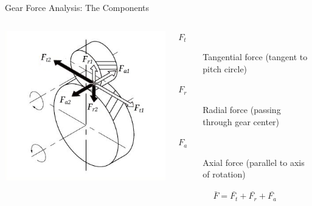 \documentclass[10pt, svgnames]{beamer}
\begin{document}
\begin{frame}[label={sec:org9053924}]{Gear Force Analysis: The Components}
\begin{columns}
\begin{column}{0.6\columnwidth}
\begin{center}
\includegraphics[width=.9\linewidth]{pictures/gear-force-analysis.png}
\end{center}
\end{column}

\begin{column}{0.6\columnwidth}
\begin{description}
\item[{\(F_{t}\)}] Tangential force (tangent to pitch circle)

\item[{\(F_{r}\)}] Radial force (passing through gear center)

\item[{\(F_{a}\)}] Axial force (parallel to axis of rotation)
\end{description}

\begin{gather*}
  \bar{F} = \bar{F_{t}} + \bar{F_{r}} + \bar{F_{a}}
\end{gather*}
\end{column}
\end{columns}
\end{frame}
\end{document}
